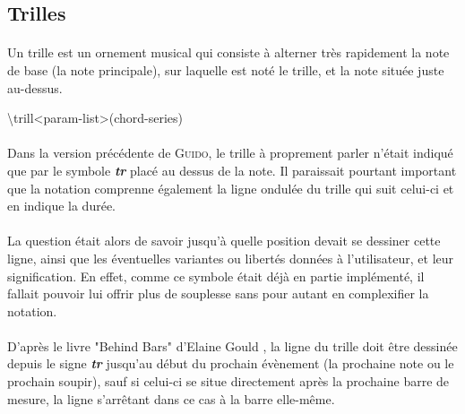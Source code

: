 \documentclass[a4paper,10pt,twocolumn]{article}
\newenvironment{code}
  {\fontfamily{pnc}\selectfont}{}
\begin{document}
\subsection{Trilles}


\paragraph{}
Un trille est \og{}un ornement musical qui consiste à alterner très rapidement la note de base (la note principale), sur laquelle est noté le trille, et la note située juste au-dessus\fg{}.

\begin{code}
\textbackslash{}trill\textless{}param-list\textgreater{}(chord-series)
\end{code}

\paragraph{}
Dans la version précédente de \textsc{Guido}, le trille à proprement parler n'était indiqué que par le symbole \textit{\textbf{tr}} placé au dessus de la note. Il paraissait pourtant important que la notation comprenne également la ligne ondulée du trille qui suit celui-ci et en indique la durée.

\paragraph{}
La question était alors de savoir jusqu'à quelle position devait se dessiner cette ligne, ainsi que les éventuelles variantes ou libertés données à l'utilisateur, et leur signification. En effet, comme ce symbole était déjà en partie implémenté, il fallait pouvoir lui offrir plus de souplesse sans pour autant en complexifier la notation.

\paragraph{}
D'après le livre "Behind Bars" d'Elaine Gould \cite{ref2}, la ligne du trille doit être dessinée depuis le signe \textit{\textbf{tr}} jusqu'au début du prochain évènement (la prochaine note ou le prochain soupir), sauf si celui-ci se situe directement après la prochaine barre de mesure, la ligne s'arrêtant dans ce cas à la barre elle-même. 
\end{document}
